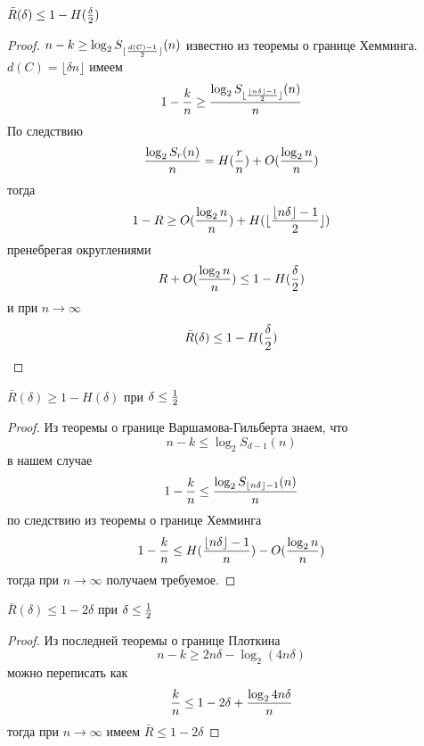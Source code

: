 \begin{proposition}
$\bar{R}(\delta) \le 1 - H({\delta \over 2})$
\end{proposition}

\begin{proof}
$n-k \ge \log_2 S_{\lfloor {d(C)-1 \over 2} \rfloor} (n)$ известно из теоремы
о границе Хемминга. $d(C) = \lfloor \delta n \rfloor$ имеем
$$1 - {k \over n} \ge
 { \log_2 S_{\lfloor{ \lfloor n \delta \rfloor - 1 \over 2} \rfloor}(n) \over n}$$
По следствию 
$${\log_2 S_r(n) \over n} = H({r \over n}) + O({\log_2 n \over n})$$
тогда 
$$1 - R \ge O({\log_2 n \over n}) + 
H({\lfloor {\lfloor n \delta \rfloor - 1 \over 2} \rfloor})$$
пренебрегая округлениями
$$R + O({\log_2 n \over n}) \le 1 - H({\delta \over 2})$$
и при $n \to \infty$
$$\bar{R}(\delta) \le 1 - H({\delta \over 2})$$
\end{proof}


\begin{proposition}
$\bar{R}(\delta) \ge 1 - H(\delta)$ при $\delta \le {1 \over 2}$
\end{proposition}

\begin{proof}
Из теоремы о границе Варшамова-Гильберта знаем, что
$$n-k \le \log_2 S_{d-1} (n)$$
в нашем случае 
$$1 - {k \over n} \le {\log_2 S_{\lfloor n\delta \rfloor - 1} (n) \over n}$$
по следствию из теоремы о границе Хемминга
$$1 - {k \over n} \le H({\lfloor n \delta \rfloor - 1 \over n}) - O({\log_2 n \over n})$$
тогда при $n \to \infty$ получаем требуемое.
\end{proof}

\begin{proposition}
$\bar{R} (\delta) \le 1 - 2\delta$ при $\delta \le {1 \over 2}$
\end{proposition}
\begin{proof}
Из последней теоремы о границе Плоткина
$$n - k \ge 2 n \delta - \log_2 (4 n \delta)$$
можно переписать как
$${k \over n} \le 1 - 2 \delta + {\log_2 4 n \delta \over n}$$
тогда при $n \to \infty$ имеем $\bar{R} \le 1 - 2 \delta$
\end{proof}

